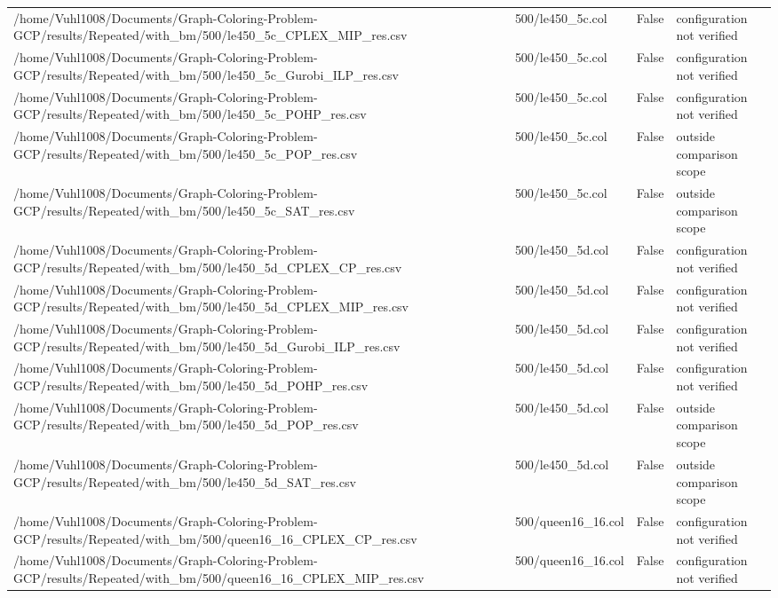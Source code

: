 \begin{table}[htbp]
\begin{tabular}{llll}
/home/Vuhl1008/Documents/Graph-Coloring-Problem-GCP/results/Repeated/with\_bm/500/le450\_5c\_CPLEX\_MIP\_res.csv & 500/le450\_5c.col & False & configuration not verified \\
/home/Vuhl1008/Documents/Graph-Coloring-Problem-GCP/results/Repeated/with\_bm/500/le450\_5c\_Gurobi\_ILP\_res.csv & 500/le450\_5c.col & False & configuration not verified \\
/home/Vuhl1008/Documents/Graph-Coloring-Problem-GCP/results/Repeated/with\_bm/500/le450\_5c\_POHP\_res.csv & 500/le450\_5c.col & False & configuration not verified \\
/home/Vuhl1008/Documents/Graph-Coloring-Problem-GCP/results/Repeated/with\_bm/500/le450\_5c\_POP\_res.csv & 500/le450\_5c.col & False & outside comparison scope \\
/home/Vuhl1008/Documents/Graph-Coloring-Problem-GCP/results/Repeated/with\_bm/500/le450\_5c\_SAT\_res.csv & 500/le450\_5c.col & False & outside comparison scope \\
/home/Vuhl1008/Documents/Graph-Coloring-Problem-GCP/results/Repeated/with\_bm/500/le450\_5d\_CPLEX\_CP\_res.csv & 500/le450\_5d.col & False & configuration not verified \\
/home/Vuhl1008/Documents/Graph-Coloring-Problem-GCP/results/Repeated/with\_bm/500/le450\_5d\_CPLEX\_MIP\_res.csv & 500/le450\_5d.col & False & configuration not verified \\
/home/Vuhl1008/Documents/Graph-Coloring-Problem-GCP/results/Repeated/with\_bm/500/le450\_5d\_Gurobi\_ILP\_res.csv & 500/le450\_5d.col & False & configuration not verified \\
/home/Vuhl1008/Documents/Graph-Coloring-Problem-GCP/results/Repeated/with\_bm/500/le450\_5d\_POHP\_res.csv & 500/le450\_5d.col & False & configuration not verified \\
/home/Vuhl1008/Documents/Graph-Coloring-Problem-GCP/results/Repeated/with\_bm/500/le450\_5d\_POP\_res.csv & 500/le450\_5d.col & False & outside comparison scope \\
/home/Vuhl1008/Documents/Graph-Coloring-Problem-GCP/results/Repeated/with\_bm/500/le450\_5d\_SAT\_res.csv & 500/le450\_5d.col & False & outside comparison scope \\
/home/Vuhl1008/Documents/Graph-Coloring-Problem-GCP/results/Repeated/with\_bm/500/queen16\_16\_CPLEX\_CP\_res.csv & 500/queen16\_16.col & False & configuration not verified \\
/home/Vuhl1008/Documents/Graph-Coloring-Problem-GCP/results/Repeated/with\_bm/500/queen16\_16\_CPLEX\_MIP\_res.csv & 500/queen16\_16.col & False & configuration not verified \\

\end{tabular}
\end{table}
